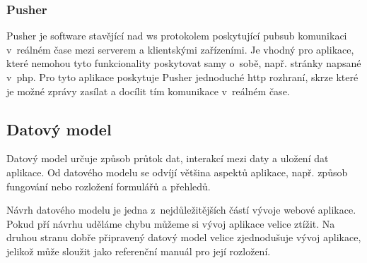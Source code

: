 \subsubsection{Pusher}
\label{subsub:pusher}

Pusher\cite{pusher} je software stavějící nad \acrshort{ws} protokolem poskytující \gls{pubsub} komunikaci v~reálném čase mezi serverem a klientskými zařízeními. Je vhodný pro aplikace, které nemohou tyto funkcionality poskytovat samy o~sobě, např. stránky napsané v~\acrshort{php}. Pro tyto aplikace poskytuje Pusher jednoduché \acrshort{http} rozhraní, skrze které je možné zprávy zasílat a docílit tím komunikace v~reálném čase.

\subsection{Datový model}

Datový model\cite{data-model} určuje způsob průtok dat, interakcí mezi daty a uložení dat aplikace. Od datového modelu se odvíjí většina aspektů aplikace, např. způsob fungování nebo rozložení formulářů a přehledů.

Návrh datového modelu je jedna z~nejdůležitějších částí vývoje webové aplikace.  Pokud pří návrhu uděláme chybu můžeme si vývoj aplikace velice ztížit. Na druhou stranu dobře připravený datový model velice zjednodušuje vývoj aplikace, jelikož může sloužit jako referenční manuál pro její rozložení.